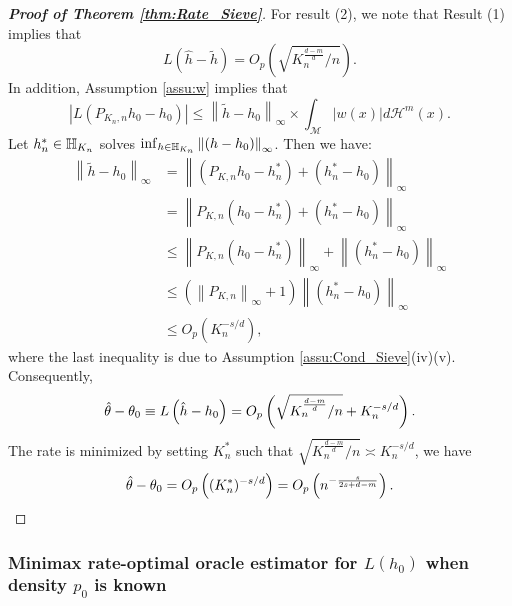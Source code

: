 \documentclass[12pt,american]{article}
\theoremstyle{definition}
\theoremstyle{plain}
\theoremstyle{definition}
\theoremstyle{plain}
\theoremstyle{plain}
\theoremstyle{plain}
\theoremstyle{plain}
\theoremstyle{plain}
\newcommand{\norm}[1]{\left\| #1 \right\|}
\begin{document}
\begin{proof}[\textbf{Proof of Theorem \ref{thm:Rate_Sieve}}]
For result (2), we note that Result (1) implies that
\[
L\left(\hat{h}-\tilde{h}\right)=O_{p}\left(\sqrt{K_{n}^{\frac{d-m}{d}}/n}\right).
\]
In addition, Assumption \ref{assu:w} implies that
\[
\left| L\left(P_{K_n,n}h_0 - h_0\right)\right |\leq \norm{\tilde{h}-h_{0}}_{\infty} \times \int_{\mathcal{M}} |w(x)| d\mathcal{H}^m (x).
\]
Let $h^*_n \in {\mathbb{H}}_{K_n}$ solves $\inf_{h \in {\H}_{K_n}}\norm{(h-h_{0})}_{\infty}$. Then we have:
\begin{align*}
    \norm{\tilde{h}-h_{0}}_{\infty}&=\norm{(P_{K,n}h_0-h^*_n) +(h^*_n-h_{0})}_{\infty}\\
                               &=\norm{P_{K,n}(h_0-h^*_n) +(h^*_n-h_{0})}_{\infty}\\
                               &\leq \norm{P_{K,n}(h_0-h^*_n)}_{\infty}+\norm{(h^*_n-h_{0})}_{\infty}\\
                               &\leq \left(\norm{P_{K,n}}_{\infty}+1\right)\norm{(h^*_n-h_{0})}_{\infty}\\
                               &\leq O_p\left(K_n^{-s/d}\right),
    \end{align*}
where the last inequality is due to Assumption \ref{assu:Cond_Sieve}(iv)(v).
Consequently,
\[
\hat{\theta}-\theta_{0}\equiv L\left(\hat{h}-h_{0}\right)=O_{p}\left(\sqrt{K_{n}^{\frac{d-m}{d}}/n}+K_{n}^{-s/d}\right).
\]
The rate is minimized by setting $K^*_{n}$ such that $\sqrt{K_{n}^{\frac{d-m}{d}}/n}\asymp K_{n}^{-s/d}$,
we have
\[
\hat{\theta}-\theta_{0}=O_{p}\left((K^*_{n})^{-s/d}\right)=O_{p}\left(n^{-\frac{s}{2s+d-m}}\right).
\]
\end{proof}

\subsubsection{Minimax rate-optimal oracle estimator for $L(h_0)$ when density $p_0$ is known}\label{subsubsec:oracle_known_fx}
\end{document}
